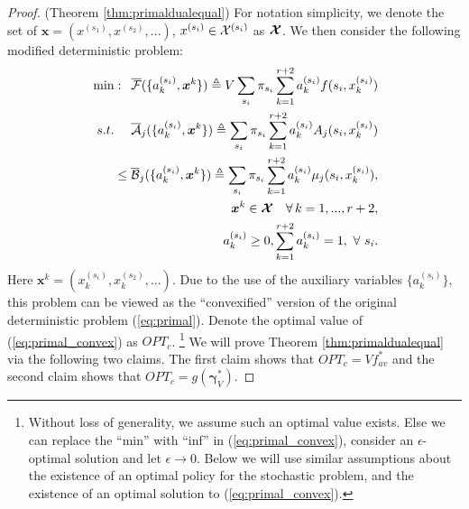 \documentclass[journal]{IEEEtran}
\newcommand{\bv}[1]{{\boldsymbol{#1} }}
\newcommand{\script}[1]{{{\cal{#1} }}}
\begin{document}
\begin{proof} (Theorem \ref{thm:primaldualequal})
For notation simplicity, we denote the set of $\bv{x}=(x^{(s_1)}, x^{(s_2)}, ...)$, $x^{(s_i)}\in\script{X}^{(s_i)}$ as $\bv{\script{X}}$. We then consider the following modified deterministic problem:
\begin{eqnarray}
\hspace{-.4in}&&\min:\,\,\, \overline{\script{F}}(\{a_k^{(s_i)}, \bv{x}^k\})\triangleq V\sum_{s_i}\pi_{s_i}\sum_{k=1}^{r+2}a^{(s_i)}_kf(s_i, x^{(s_i)}_k)\label{eq:primal_convex}\\
\hspace{-.4in}&&s.t.\quad\,\,\overline{\script{A}}_j(\{a_k^{(s_i)}, \bv{x}^k\})\triangleq\sum_{s_i}\pi_{s_i}\sum_{k=1}^{r+2}a^{(s_i)}_kA_j(s_i, x^{(s_i)}_k)\nonumber\\
\hspace{-.4in}&&\qquad\qquad\leq \overline{\script{B}}_j(\{a_k^{(s_i)}, \bv{x}^k\})\triangleq\sum_{s_i}\pi_{s_i}\sum_{k=1}^{r+2}a^{(s_i)}_k\mu_j(s_i, x^{(s_i)}_k),\nonumber\\
\hspace{-.4in}&&\qquad\quad \bv{x}^k\in \bv{\script{X}}\quad \forall\, k=1, ..., r+2,\nonumber\\
\hspace{-.4in}&&\qquad\quad a^{(s_i)}_k\geq0, \sum_{k=1}^{r+2}a^{(s_i)}_k=1, \,\,\forall\,\, s_i.\nonumber
\end{eqnarray}
Here $\bv{x}^k=(x^{(s_i)}_k, x^{(s_2)}_k, ...)$. 
Due to the use of the auxiliary variables $\{a^{(s_i)}_k\}$, this problem can be viewed as the ``convexified'' version of the original deterministic problem (\ref{eq:primal}). Denote the optimal value of (\ref{eq:primal_convex}) as $OPT_c$. \footnote{Without loss of generality, we assume such an optimal value exists. Else we can replace the ``min'' with ``inf'' in (\ref{eq:primal_convex}), 
consider an $\epsilon$-optimal solution and let $\epsilon\rightarrow0$. Below we will use similar assumptions about the existence of an optimal policy for the stochastic problem, and the existence of an optimal solution to (\ref{eq:primal_convex}). } We will prove Theorem \ref{thm:primaldualequal} via the following two claims. The first claim shows that $OPT_c=Vf^*_{av}$ and the second claim shows that $OPT_c=g(\bv{\gamma}^*_V)$. 


\end{proof}
\end{document}
